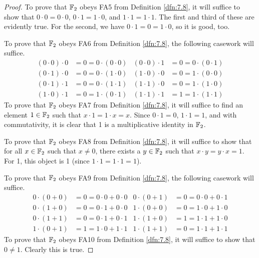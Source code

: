 \documentclass[../main.tex]{subfiles}
\begin{document}
\begin{exercise}
\begin{proof}
        To prove that $\mathbb{F}_2$ obeys FA5 from Definition \ref{dfn:7.8}, it will suffice to show that $0\cdot 0=0\cdot 0$, $0\cdot 1=1\cdot 0$, and $1\cdot 1=1\cdot 1$. The first and third of these are evidently true. For the second, we have $0\cdot 1=0=1\cdot 0$, so it is good, too.\par
        To prove that $\mathbb{F}_2$ obeys FA6 from Definition \ref{dfn:7.8}, the following casework will suffice.
        \begin{align*}
            (0\cdot 0)\cdot 0 &= 0 = 0\cdot (0\cdot 0)&
            (0\cdot 0)\cdot 1 &= 0 = 0\cdot (0\cdot 1)\\
            (0\cdot 1)\cdot 0 &= 0 = 0\cdot (1\cdot 0)&
            (1\cdot 0)\cdot 0 &= 0 = 1\cdot (0\cdot 0)\\
            (0\cdot 1)\cdot 1 &= 0 = 0\cdot (1\cdot 1)&
            (1\cdot 1)\cdot 0 &= 0 = 1\cdot (1\cdot 0)\\
            (1\cdot 0)\cdot 1 &= 0 = 1\cdot (0\cdot 1)&
            (1\cdot 1)\cdot 1 &= 1 = 1\cdot (1\cdot 1)
        \end{align*}
        To prove that $\mathbb{F}_2$ obeys FA7 from Definition \ref{dfn:7.8}, it will suffice to find an element $1\in\mathbb{F}_2$ such that $x\cdot 1=1\cdot x=x$. Since $0\cdot 1=0$, $1\cdot 1=1$, and with commutativity, it is clear that 1 is a multiplicative identity in $\mathbb{F}_2$.\par
        To prove that $\mathbb{F}_2$ obeys FA8 from Definition \ref{dfn:7.8}, it will suffice to show that for all $x\in\mathbb{F}_2$ such that $x\neq 0$, there exists a $y\in\mathbb{F}_2$ such that $x\cdot y=y\cdot x=1$. For 1, this object is 1 (since $1\cdot 1=1\cdot 1=1$).\par
        To prove that $\mathbb{F}_2$ obeys FA9 from Definition \ref{dfn:7.8}, the following casework will suffice.
        \begin{align*}
            0\cdot(0+0) &= 0 = 0\cdot 0+0\cdot 0&
            0\cdot(0+1) &= 0 = 0\cdot 0+0\cdot 1\\
            0\cdot(1+0) &= 0 = 0\cdot 1+0\cdot 0&
            1\cdot(0+0) &= 0 = 1\cdot 0+1\cdot 0\\
            0\cdot(1+1) &= 0 = 0\cdot 1+0\cdot 1&
            1\cdot(1+0) &= 1 = 1\cdot 1+1\cdot 0\\
            1\cdot(0+1) &= 1 = 1\cdot 0+1\cdot 1&
            1\cdot(1+1) &= 0 = 1\cdot 1+1\cdot 1
        \end{align*}
        To prove that $\mathbb{F}_2$ obeys FA10 from Definition \ref{dfn:7.8}, it will suffice to show that $0\neq 1$. Clearly this is true.

    \end{proof}
\end{exercise}
\end{document}
